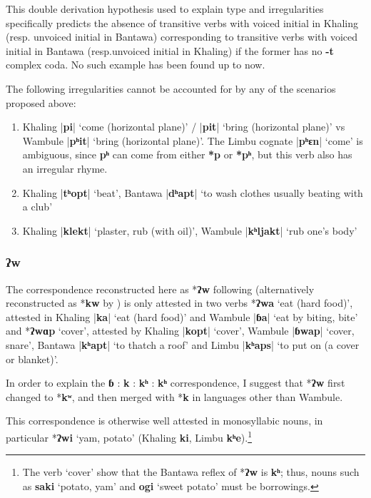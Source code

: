 \documentclass[oneside,a4paper,11pt]{article}
\newcommand{\ipa}[1]{\textbf{{\phon\mbox{#1}}}} %
\newcommand{\dhatu}[2]{|\ipa{#1}| `#2'}
\begin{document}
 This double derivation hypothesis used to explain type  and irregularities specifically predicts the absence of transitive verbs with voiced initial in Khaling (resp. unvoiced initial in Bantawa) corresponding to transitive verbs with voiced initial in Bantawa (resp.unvoiced initial in Khaling) if the former has no \ipa{-t} complex coda. No such example has been found up to now.
 
The following irregularities cannot be accounted for by any of the scenarios proposed above:

\begin{enumerate}
\item  Khaling \dhatu{pi}{come (horizontal plane)} / \dhatu{pit}{bring (horizontal plane)} vs Wambule \dhatu{pʰit}{bring (horizontal plane)}. The Limbu cognate \dhatu{pʰɛn}{come} is ambiguous, since \ipa{pʰ} can come from either \ipa{*p} or \ipa{*pʰ}, but this verb also has an irregular rhyme. 
\item Khaling  \dhatu{tʰopt}{beat}, Bantawa \dhatu{dʰapt}{to wash clothes usually beating with a club}
\item Khaling  \dhatu{klekt}{plaster, rub (with oil)}, Wambule \dhatu{kʰljakt}{rub one's body}
 \end{enumerate}

\subsubsection{\ipa{ʔw}}
The correspondence reconstructed here as *\ipa{ʔw} following \citet{michailovsky94stops} (alternatively reconstructed as *\ipa{kw} by \citealt{opgenort04implosives}) is only attested in two verbs *\ipa{ʔwa} `eat (hard food)', attested in Khaling \dhatu{ka}{eat (hard food)} and Wambule \dhatu{ɓa}{eat by biting, bite} and  *\ipa{ʔwɑp} `cover', attested by  Khaling \dhatu{kopt}{cover}, Wambule \dhatu{ɓwap}{cover, snare}, Bantawa \dhatu{kʰapt}{to thatch a roof} and Limbu  \dhatu{kʰaps}{to put on (a cover or blanket)}. 

In order to explain the \ipa{ɓ} : \ipa{k} : \ipa{kʰ} : \ipa{kʰ} correspondence, I suggest that  *\ipa{ʔw} first changed to *\ipa{kʷ}, and then merged with *\ipa{k} in languages other than Wambule.
 
 This correspondence is otherwise well attested in monosyllabic nouns, in particular *\ipa{ʔwi} `yam, potato' (Khaling \ipa{ki}, Limbu \ipa{kʰe}).\footnote{The verb `cover' show that the Bantawa reflex of *\ipa{ʔw} is \ipa{kʰ}; thus, nouns such as \ipa{saki} `potato, yam' and \ipa{ogi} `sweet potato' must be borrowings.}
\end{document}
